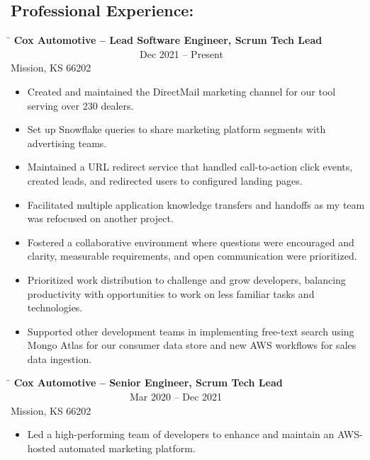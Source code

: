\documentclass{res}
\begin{document}
\begin{resume}
\section{Professional Experience:}
\begin{changemargin}{-0.25in}{0in}
	\begin{tabbing}
		\hspace{5.5in}\= \kill 
		{\bf Cox Automotive – Lead Software Engineer, Scrum Tech Lead} \>~~~~~~~~~~~~~~~~~~~~~~~~~~Dec 2021 – Present\\
		Mission, KS 66202
	\end{tabbing}\vspace{-1pt}
	\begin{itemize}
		\item Created and maintained the DirectMail marketing channel for our tool serving over 230 dealers.
		\item Set up Snowflake queries to share marketing platform segments with advertising teams.
		\item Maintained a URL redirect service that handled call-to-action click events, created leads, and redirected users to configured landing pages.
		\item Facilitated multiple application knowledge transfers and handoffs as my team was refocused on another project.
		\item Fostered a collaborative environment where questions were encouraged and clarity, measurable requirements, and open communication were prioritized.
		\item Prioritized work distribution to challenge and grow developers, balancing productivity with opportunities to work on less familiar tasks and technologies.
		\item Supported other development teams in implementing free-text search using Mongo Atlas for our consumer data store and new AWS workflows for sales data ingestion.
		\vspace{-15pt}
	\end{itemize}
	\vspace{0.2in}
	\begin{tabbing}
		\hspace{5.5in}\= \kill 
		{\bf Cox Automotive – Senior Engineer, Scrum Tech Lead} \>~~~~~~~~~~~~~~~~~~~~~~~~Mar 2020 – Dec 2021\\
		Mission, KS 66202
	\end{tabbing}\vspace{-1pt}
	\begin{itemize}
		\item Led a high-performing team of developers to enhance and maintain an AWS-hosted automated marketing platform.

\end{itemize}
\end{changemargin}
\end{resume}
\end{document}

